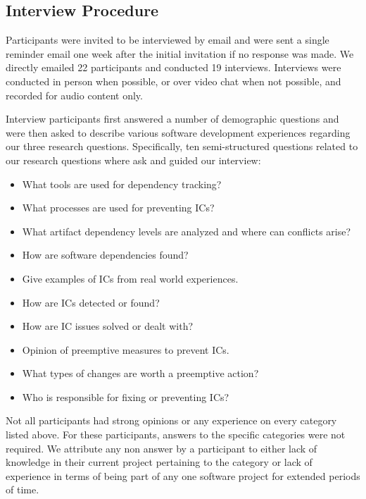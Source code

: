 \documentclass[conference]{IEEEtran}
\begin{document}
\subsection{Interview Procedure}

Participants were invited to be interviewed by email and were sent a single reminder email one week
after the initial invitation if no response was made. We directly emailed 22 participants and  conducted
19 interviews. Interviews were conducted in person when possible, or over video chat when not possible, and recorded for audio content only.


Interview participants first answered a number of demographic questions and were then asked to describe various software development experiences regarding our three research questions.
Specifically, ten semi-structured questions related to our research questions where ask and guided our interview:

\begin{itemize}
\item What tools are used for dependency tracking?
\item What processes are used for preventing ICs?
\item What artifact dependency levels are analyzed and where can conflicts arise?
\item How are software dependencies found?
\item Give examples of ICs from real world experiences.
\item How are ICs detected or found?
\item How are IC issues solved or dealt with?
\item Opinion of preemptive measures to prevent ICs.
\item What types of changes are worth a preemptive action?
\item Who is responsible for fixing or preventing ICs?
\end{itemize}

Not all participants had strong opinions or any experience on every category listed above. For these participants, answers
to the specific categories were not required. We attribute any non answer by a participant to
either lack of knowledge in their current project pertaining to the category or lack of experience in terms of
being part of any one software project for extended periods of time.
\end{document}
